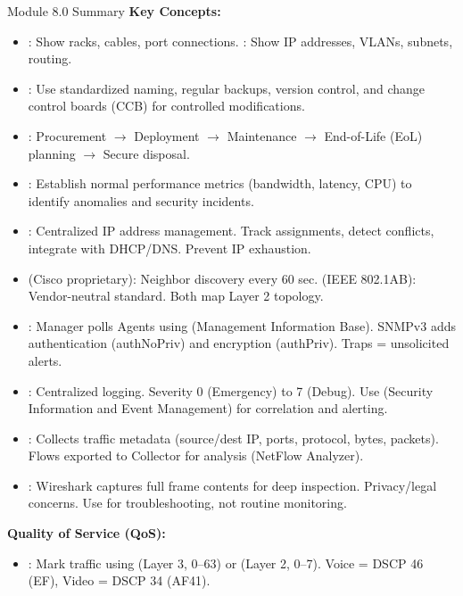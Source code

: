 \documentclass[aspectratio=169]{beamer}  %
\begin{document}
\begin{frame}[t,allowframebreaks]{Module 8.0 Summary}
    \small
    \textbf{Key Concepts:}
    \begin{itemize}
        \item {}: Show racks, cables, port connections. : Show IP addresses, VLANs, subnets, routing.
        \item {}: Use standardized naming, regular backups, version control, and change control boards (CCB) for controlled modifications.
        \item {}: Procurement $\rightarrow$ Deployment $\rightarrow$ Maintenance $\rightarrow$ End-of-Life (EoL) planning $\rightarrow$ Secure disposal.
        \item {}: Establish normal performance metrics (bandwidth, latency, CPU) to identify anomalies and security incidents.
        \item {}: Centralized IP address management. Track assignments, detect conflicts, integrate with DHCP/DNS. Prevent IP exhaustion.
        \item {} (Cisco proprietary): Neighbor discovery every 60 sec.  (IEEE 802.1AB): Vendor-neutral standard. Both map Layer 2 topology.
        \item {}: Manager polls Agents using  (Management Information Base). SNMPv3 adds authentication (authNoPriv) and encryption (authPriv). Traps = unsolicited alerts.
        \item {}: Centralized logging. Severity 0 (Emergency) to 7 (Debug). Use  (Security Information and Event Management) for correlation and alerting.
        \item {}: Collects traffic metadata (source/dest IP, ports, protocol, bytes, packets). Flows exported to Collector for analysis (NetFlow Analyzer).
        \item {}: Wireshark captures full frame contents for deep inspection. Privacy/legal concerns. Use for troubleshooting, not routine monitoring.
    \end{itemize}
    \framebreak
    \vspace{0.3em}
    \textbf{Quality of Service (QoS):}
    \begin{itemize}
        \item {}: Mark traffic using  (Layer 3, 0--63) or  (Layer 2, 0--7). Voice = DSCP 46 (EF), Video = DSCP 34 (AF41).

\end{itemize}
\end{frame}
\end{document}
